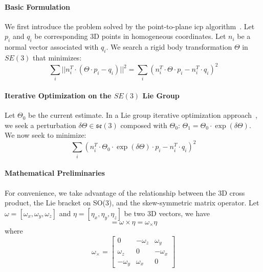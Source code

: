 
\paragraph{Basic Formulation}
We first introduce the problem solved by the point-to-plane \gls{icp} algorithm~\cite{Rusinkiewicz:IC3DIM:2001}.
Let $p_i$ and $q_i$ be corresponding 3D points in homogeneous coordinates. Let $n_i$ be a normal vector associated with $q_i$. We search a rigid body transformation $\Theta$ in $SE(3)$ that minimizes:
\begin{equation}
\sum_i ||n_i^T \cdot (\Theta \cdot p_i - q_i)||^2 = \sum_i (n_i^T \cdot \Theta \cdot p_i - n_i^T \cdot q_i)^2
\end{equation}

\paragraph{Iterative Optimization on the $SE(3)$ Lie Group}
Let $\Theta_0$ be the current estimate. In a Lie group iterative optimization approach~\cite{Mahony:JGO:2002,Vercauteren:IPMI:2007}, we seek a perturbation $\delta\Theta \in \mathfrak{se}(3)$ composed with
$\Theta_0$: $\Theta_1 = \Theta_0 \cdot \exp(\delta\Theta)$. We now seek to minimize:
\begin{equation}
\sum_i (n_i^T \cdot \Theta_0 \cdot \exp(\delta\Theta) \cdot p_i - n_i^T \cdot q_i)^2
\end{equation}

\paragraph{Mathematical Preliminaries}
For convenience, we take advantage of the relationship between the 3D cross product, the Lie bracket on SO(3), and the skew-symmetric matrix operator.
Let $\omega = [\omega_x, \omega_y, \omega_z]$ and $\eta = [\eta_x, \eta_y, \eta_z]$ be two 3D vectors, we have
\begin{equation}
[\omega, \eta] = \omega \times \eta = \omega_\times \eta
\end{equation}
where
\begin{equation}
\omega_\times =
\begin{bmatrix}
0         & -\omega_z & \omega_y \\
\omega_z  & 0         & -\omega_x \\
-\omega_y & \omega_x  & 0
\end{bmatrix}
\end{equation}

